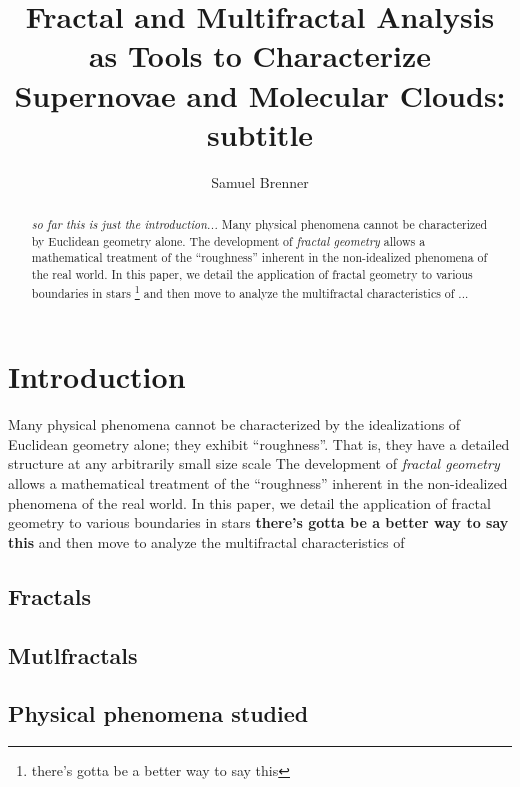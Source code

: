 \documentclass[iop]{emulateapj}
\begin{document}
%
\title{Fractal and Multifractal Analysis as Tools to Characterize Supernovae and Molecular Clouds: \\
subtitle}
%
\author{Samuel Brenner}
%
%
%
%
%
%
\begin{abstract}
\textit{so far this is just the introduction...} Many physical phenomena cannot be characterized by Euclidean geometry alone. The development of \textit{fractal geometry} allows a mathematical treatment of the ``roughness'' inherent in the non-idealized phenomena of the real world. In this paper, we detail the application of fractal geometry to various boundaries in stars \footnote{there's gotta be a better way to say this} and then move to analyze the multifractal characteristics of ...
\end{abstract}
%
%
%
%
%
%

\section{Introduction}
Many physical phenomena cannot be characterized by the idealizations of Euclidean geometry alone; they exhibit ``roughness''. That is, they have a detailed structure at any arbitrarily small size scale \citep{Falconer2003} The development of \textit{fractal geometry} allows a mathematical treatment of the ``roughness'' inherent in the non-idealized phenomena of the real world. In this paper, we detail the application of fractal geometry to various boundaries in stars \textbf{there's gotta be a better way to say this} and then move to analyze the multifractal characteristics of 
\subsection{Fractals}
\subsection{Mutlfractals}
\subsection{Physical phenomena studied}
\end{document}
